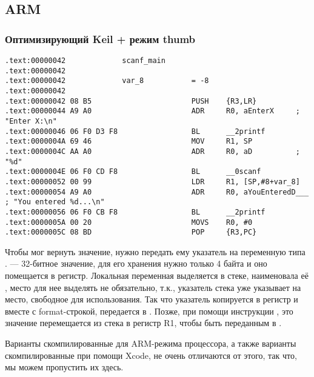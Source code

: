 ﻿%
\subsection{ARM}

\subsubsection{Оптимизирующий Keil + режим thumb}

\begin{lstlisting}
.text:00000042             scanf_main
.text:00000042
.text:00000042             var_8           = -8
.text:00000042
.text:00000042 08 B5                       PUSH    {R3,LR}
.text:00000044 A9 A0                       ADR     R0, aEnterX     ; "Enter X:\n"
.text:00000046 06 F0 D3 F8                 BL      __2printf
.text:0000004A 69 46                       MOV     R1, SP
.text:0000004C AA A0                       ADR     R0, aD          ; "%d"
.text:0000004E 06 F0 CD F8                 BL      __0scanf
.text:00000052 00 99                       LDR     R1, [SP,#8+var_8]
.text:00000054 A9 A0                       ADR     R0, aYouEnteredD___ ; "You entered %d...\n"
.text:00000056 06 F0 CB F8                 BL      __2printf
.text:0000005A 00 20                       MOVS    R0, #0
.text:0000005C 08 BD                       POP     {R3,PC}
\end{lstlisting}

Чтобы \scanf мог вернуть значение, нужно передать ему указатель на переменную типа \Tint. \Tint --- 32-битное 
значение, для его хранения нужно только 4 байта и оно помещается в регистр.
Локальная переменная  выделяется в стеке, \IDA наименовала её , место для нее выделять
не обязательно, т.к., указатель стека \SP уже указывает на место, свободное для использования.
Так что указатель \SP копируется в регистр  и вместе с format-строкой, передается в \scanf.
Позже, при помощи инструкции , это значение перемещается из стека в регистр R1, чтобы быть переданным
в \printf.

Варианты скомпилированные для ARM-режима процессора, а также варианты скомпилированные при помощи Xcode,
не очень отличаются от этого, так что, мы можем пропустить их здесь.

